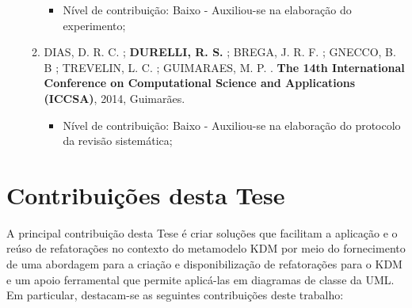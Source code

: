 \begin{itemize}
\begin{enumerate}
		    \begin{itemize}
			        \item Nível de contribuição: Baixo - Auxiliou-se na elaboração do experimento;
			    \end{itemize}
		
		\item DIAS, D. R. C. ; \textbf{DURELLI, R. S.} ; BREGA, J. R. F. ; GNECCO, B. B ; TREVELIN, L. C. ; GUIMARAES, M. P. . \textbf{The 14th International Conference on Computational Science and Applications (ICCSA)}, 2014, Guimarães.
		
		    \begin{itemize}
			        \item Nível de contribuição: Baixo - Auxiliou-se na elaboração do protocolo da revisão sistemática;
			    \end{itemize}

\end{enumerate}
\end{itemize}

\section{Contribuições desta Tese}\label{sec:contribuicoes_desta_tese}

A principal contribuição desta Tese é criar soluções que facilitam a aplicação e o reúso de refatorações no contexto do metamodelo KDM por meio do fornecimento de uma abordagem para a criação e disponibilização de refatorações para o KDM e um apoio ferramental que permite aplicá-las em diagramas de classe da UML. %
%
Em particular, destacam-se as seguintes contribuições deste trabalho:

